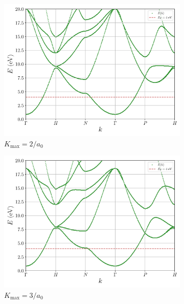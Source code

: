 \documentclass[a4paper,DIV=12,english]{scrartcl}
\begin{document}
\begin{figure}
    \centering 
    \begin{subfigure}{0.49\textwidth}
        \centering 
        \includegraphics[width=\textwidth]{../plots/bs_2_R_130.pdf}
        \caption{$K_\text{max} = 2/a_0$}
        \label{subfig:bs_2_130_2}
    \end{subfigure}
    \begin{subfigure}{0.49\textwidth}
        \centering 
        \includegraphics[width=\textwidth]{../plots/bs_3_R_130.pdf}
        \caption{$K_\text{max} = 3/a_0$}
        \label{subfig:bs_3_130}
    \end{subfigure}
    \begin{subfigure}{0.49\textwidth}

\end{subfigure}
\end{figure}
\end{document}
